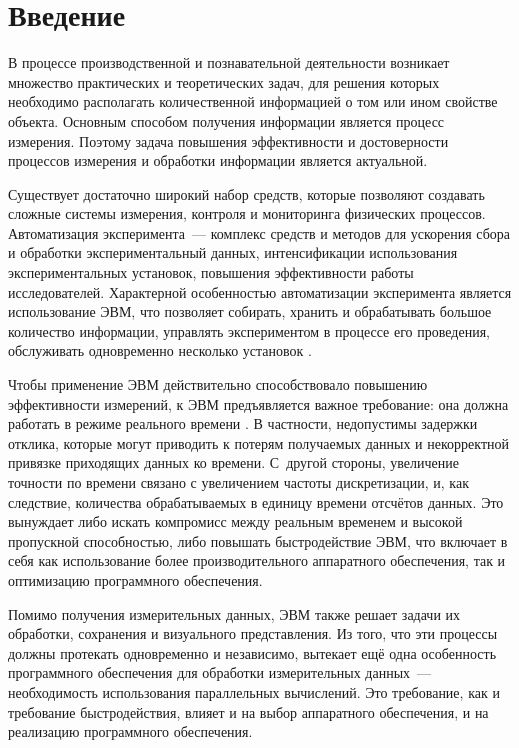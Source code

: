 \documentclass[a4paper, 14pt, titlepage]{extarticle}
\newcommand\sectiontoc[1]{\section*{#1}\addcontentsline{toc}{section}{#1}}
\let\oldsection\section
\renewcommand{\section}{\newpage\oldsection}
\begin{document}

    \clearpage
    \tableofcontents

  \sectiontoc{Введение}\label{sec:intro}

  В процессе производственной и познавательной деятельности возникает множество практических и
  теоретических задач, для решения которых необходимо располагать количественной информацией о том
  или ином свойстве объекта. Основным способом получения информации является процесс измерения.
  Поэтому задача повышения эффективности и достоверности процессов измерения и обработки информации
  является актуальной.

  Существует достаточно широкий набор средств, которые позволяют создавать сложные системы
  измерения, контроля и мониторинга физических процессов. Автоматизация эксперимента~--- комплекс
  средств и методов для ускорения сбора и обработки экспериментальный данных, интенсификации
  использования экспериментальных установок, повышения эффективности работы исследователей.
  Характерной особенностью автоматизации эксперимента является использование ЭВМ, что позволяет
  собирать, хранить и обрабатывать большое количество информации, управлять экспериментом в процессе
  его проведения, обслуживать одновременно несколько установок \cite{sokolov-auto-measure}.

  Чтобы применение ЭВМ действительно способствовало повышению эффективности измерений, к ЭВМ
  предъявляется важное требование: она должна работать в режиме реального времени
  \cite{tessier-reconfigurable}. В частности, недопустимы задержки отклика, которые могут приводить
  к потерям получаемых данных и некорректной привязке приходящих данных ко времени. С~другой
  стороны, увеличение точности по времени связано с увеличением частоты дискретизации, и, как
  следствие, количества обрабатываемых в единицу времени отсчётов данных. Это вынуждает либо искать
  компромисс между реальным временем и высокой пропускной способностью, либо повышать быстродействие
  ЭВМ, что включает в себя как использование более производительного аппаратного обеспечения, так и
  оптимизацию программного обеспечения.

  Помимо получения измерительных данных, ЭВМ также решает задачи их обработки, сохранения и
  визуального представления. Из того, что эти процессы должны протекать одновременно и независимо,
  вытекает ещё одна особенность программного обеспечения для обработки измерительных данных~---
  необходимость использования параллельных вычислений. Это требование, как и требование
  быстродействия, влияет и на выбор аппаратного обеспечения, и на реализацию программного обеспечения.
\end{document}
